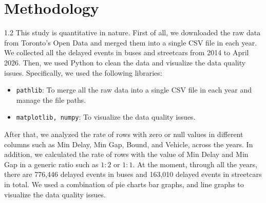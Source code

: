 \documentclass[11pt]{article}
\begin{document}
\vspace{-0.25em}
\section{Methodology}
\vspace{-0.25em}
\begin{spacing}{1.2}
This study is quantitative in nature. First of all, we downloaded the raw data from Toronto's 
Open Data and merged them into a single CSV file in each year. We collected all the delayed events
in buses and streetcars from 2014 to April 2026. Then, we used Python to clean the data and visualize 
the data quality issues. Specifically, we used the following libraries:
\begin{itemize}
    \item \texttt{pathlib}: To merge all the raw data into a single CSV file in each year and manage the file paths.
    \vspace{-0.5em}
    \item \texttt{matplotlib, numpy}: To visualize the data quality issues.
\end{itemize}

After that, we analyzed the rate of rows with zero or null values in different columns such as Min 
Delay, Min Gap, Bound, and Vehicle, across the years. In addition, we calculated the rate of rows 
with the value of Min Delay and Min Gap in a generic ratio such as $1:2$ or $1:1$. At the moment, 
through all the years, there are 776,446 delayed events in buses and 163,010 delayed events in 
streetcars in total. We used a combination of pie charts bar graphs, and line graphs to visualize 
the data quality issues. 
\end{spacing}
\end{document}
